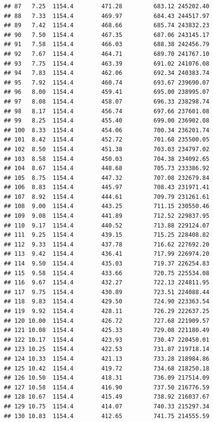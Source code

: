 \documentclass[]{article}
\begin{document}
\begin{verbatim}
## 87   7.25  1154.4        471.28         683.12 245202.40
## 88   7.33  1154.4        469.97         684.43 244517.97
## 89   7.42  1154.4        468.66         685.74 243832.23
## 90   7.50  1154.4        467.35         687.06 243145.17
## 91   7.58  1154.4        466.03         688.38 242456.79
## 92   7.67  1154.4        464.71         689.70 241767.10
## 93   7.75  1154.4        463.39         691.02 241076.08
## 94   7.83  1154.4        462.06         692.34 240383.74
## 95   7.92  1154.4        460.74         693.67 239690.07
## 96   8.00  1154.4        459.41         695.00 238995.07
## 97   8.08  1154.4        458.07         696.33 238298.74
## 98   8.17  1154.4        456.74         697.66 237601.08
## 99   8.25  1154.4        455.40         699.00 236902.08
## 100  8.33  1154.4        454.06         700.34 236201.74
## 101  8.42  1154.4        452.72         701.68 235500.05
## 102  8.50  1154.4        451.38         703.03 234797.02
## 103  8.58  1154.4        450.03         704.38 234092.65
## 104  8.67  1154.4        448.68         705.73 233386.92
## 105  8.75  1154.4        447.32         707.08 232679.84
## 106  8.83  1154.4        445.97         708.43 231971.41
## 107  8.92  1154.4        444.61         709.79 231261.61
## 108  9.00  1154.4        443.25         711.15 230550.46
## 109  9.08  1154.4        441.89         712.52 229837.95
## 110  9.17  1154.4        440.52         713.88 229124.07
## 111  9.25  1154.4        439.15         715.25 228408.82
## 112  9.33  1154.4        437.78         716.62 227692.20
## 113  9.42  1154.4        436.41         717.99 226974.20
## 114  9.50  1154.4        435.03         719.37 226254.83
## 115  9.58  1154.4        433.66         720.75 225534.08
## 116  9.67  1154.4        432.27         722.13 224811.95
## 117  9.75  1154.4        430.89         723.51 224088.44
## 118  9.83  1154.4        429.50         724.90 223363.54
## 119  9.92  1154.4        428.11         726.29 222637.25
## 120 10.00  1154.4        426.72         727.68 221909.57
## 121 10.08  1154.4        425.33         729.08 221180.49
## 122 10.17  1154.4        423.93         730.47 220450.01
## 123 10.25  1154.4        422.53         731.87 219718.14
## 124 10.33  1154.4        421.13         733.28 218984.86
## 125 10.42  1154.4        419.72         734.68 218250.18
## 126 10.50  1154.4        418.31         736.09 217514.09
## 127 10.58  1154.4        416.90         737.50 216776.59
## 128 10.67  1154.4        415.49         738.92 216037.67
## 129 10.75  1154.4        414.07         740.33 215297.34
## 130 10.83  1154.4        412.65         741.75 214555.59

\end{verbatim}
\end{document}
